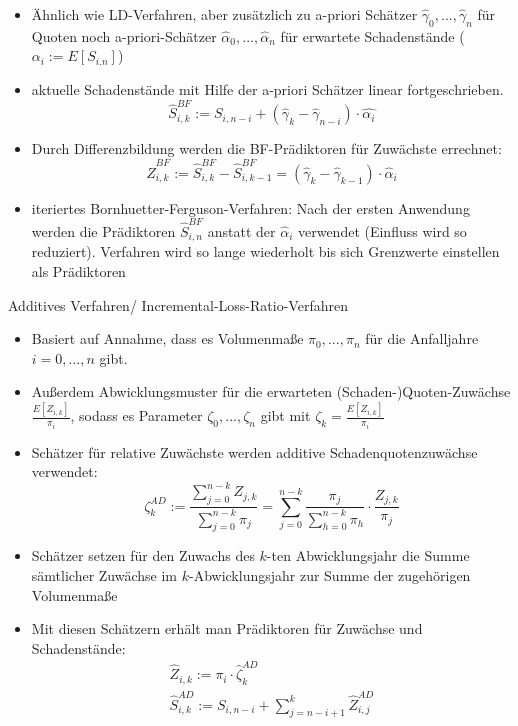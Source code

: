 \documentclass[12pt]{report}
\theoremstyle{dotless}
\theoremstyle{definition}
\begin{document}
\begin{itemize}
\item Ähnlich wie LD-Verfahren, aber zusätzlich zu a-priori Schätzer $\hat{\gamma}_0, ..., \hat{\gamma}_n$ für Quoten noch a-priori-Schätzer $\hat{\alpha}_0, ..., \hat{\alpha}_n$ für erwartete Schadenstände ($\alpha_i := E[S_{i.n}]$)
\item aktuelle Schadenstände mit Hilfe der a-priori Schätzer linear fortgeschrieben.
\begin{equation}
\hat{S}_{i,k}^{BF} := S_{i,n-i}+(\hat{\gamma}_k-\hat{\gamma}_{n-i})\cdot \hat{\alpha_i}
\end{equation}
\item Durch Differenzbildung werden die BF-Prädiktoren für Zuwächste errechnet:
\begin{equation}
\hat{Z}_{i,k}^{BF} := \hat{S}_{i,k}^{BF} - \hat{S}_{i,k-1}^{BF} = (\hat{\gamma}_k - \hat{\gamma}_{k-1}) \cdot \hat{\alpha}_i
\end{equation}
\item iteriertes Bornhuetter-Ferguson-Verfahren: Nach der ersten Anwendung werden die Prädiktoren $\hat{S}_{i,n}^{BF}$ anstatt der $\hat{\alpha}_i$ verwendet (Einfluss wird so reduziert). Verfahren wird so lange wiederholt bis sich Grenzwerte einstellen als Prädiktoren
\end{itemize}
Additives Verfahren/ Incremental-Loss-Ratio-Verfahren
\begin{itemize}
\item Basiert auf Annahme, dass es Volumenmaße $\pi_0, ..., \pi_n$ für die Anfalljahre $i=0,...,n$ gibt.
\item Außerdem Abwicklungsmuster für die erwarteten (Schaden-)Quoten-Zuwächse $\frac{E[Z_{i,k}]}{\pi_i}$, sodass es Parameter $\zeta_0,...,\zeta_n$ gibt mit $\zeta_k=\frac{E[Z_{i,k}]}{\pi_i}$
\item Schätzer für relative Zuwächste werden additive Schadenquotenzuwächse verwendet:
\begin{equation}
\zeta_k^{AD} := \frac{\sum_{j=0}^{n-k} Z_{j,k}}{\sum_{j=0}^{n-k} \pi_j} = \sum_{j=0}^{n-k} \frac{\pi_j}{\sum_{h=0}^{n-k} \pi_h} \cdot \frac{Z_{j,k}}{\pi_j}
\end{equation}
\item Schätzer setzen für den Zuwachs des $k$-ten Abwicklungsjahr die Summe sämtlicher Zuwächse im $k$-Abwicklungsjahr zur Summe der zugehörigen Volumenmaße
\item Mit diesen Schätzern erhält man Prädiktoren für Zuwächse und Schadenstände:
\begin{align}
\hat{Z}_{i,k} := \pi_i \cdot \hat{\zeta}_k^{AD} \\
\hat{S}_{i,k}^{AD} := S_{i,n-i} + \sum_{j=n-i+1}^k \hat{Z}_{i,j}^{AD}
\end{align}
\end{itemize}
\end{document}

